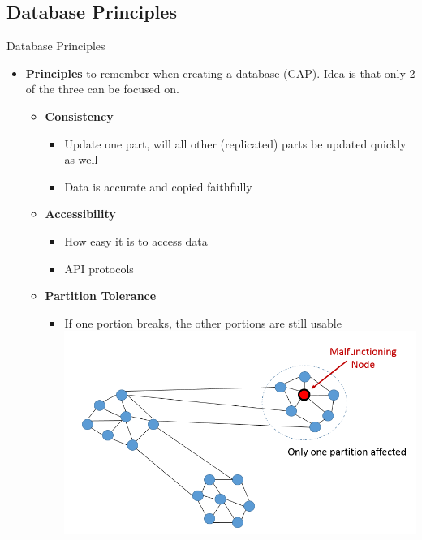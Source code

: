 \documentclass{beamer}
\begin{document}
    \subsection{Database Principles}
    \begin{frame}{Database Principles}
        \begin{itemize}
            \item \textbf{Principles} to remember when creating a database (CAP). Idea is that only 2 of the three can be focused on. \cite[Ch.~19]{Silberschatz2010}
            \begin{itemize}
                \item \textbf{Consistency}
                \begin{itemize}
                    \item Update one part, will all other (replicated) parts be updated quickly as well
                    \item Data is accurate and copied faithfully
                \end{itemize}
                \item \textbf{Accessibility}
                \begin{itemize}
                    \item How easy it is to access data
                    \item API protocols
                \end{itemize}
                \item  \textbf{Partition Tolerance}
                \begin{itemize}
                    \item If one portion breaks, the other portions are still usable
                    \centering 
                    \includegraphics[scale=0.2]{partition_tolerance.png}
                    \end{itemize} 
             \end{itemize}
        \end{itemize}
    \end{frame}
    
\end{document}

